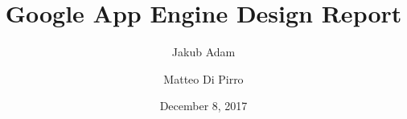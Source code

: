 \documentclass[a4paper,10pt]{article}
\begin{document}
\title{Google App Engine Design Report}
\author{Jakub Adam \and Matteo Di Pirro}
\date{December 8, 2017}

\maketitle




\end{document}
